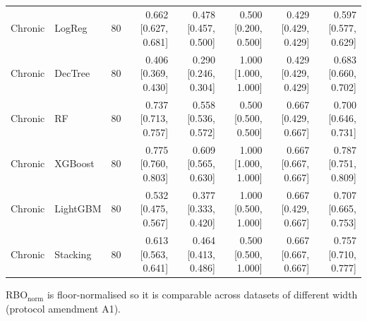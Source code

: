 \begin{table}[t]
{\begin{tabular}{llrrrrrr}
Chronic & LogReg & 80 & 0.662 [0.627, 0.681] & 0.478 [0.457, 0.500] & 0.500 [0.200, 0.500] & 0.429 [0.429, 0.429] & 0.597 [0.577, 0.629] \\
Chronic & DecTree & 80 & 0.406 [0.369, 0.430] & 0.290 [0.246, 0.304] & 1.000 [1.000, 1.000] & 0.429 [0.429, 0.429] & 0.683 [0.660, 0.702] \\
Chronic & RF & 80 & 0.737 [0.713, 0.757] & 0.558 [0.536, 0.572] & 0.500 [0.500, 0.500] & 0.667 [0.429, 0.667] & 0.700 [0.646, 0.731] \\
Chronic & XGBoost & 80 & 0.775 [0.760, 0.803] & 0.609 [0.565, 0.630] & 1.000 [1.000, 1.000] & 0.667 [0.667, 0.667] & 0.787 [0.751, 0.809] \\
Chronic & LightGBM & 80 & 0.532 [0.475, 0.567] & 0.377 [0.333, 0.420] & 1.000 [0.500, 1.000] & 0.667 [0.429, 0.667] & 0.707 [0.665, 0.753] \\
Chronic & Stacking & 80 & 0.613 [0.563, 0.641] & 0.464 [0.413, 0.486] & 0.500 [0.500, 1.000] & 0.667 [0.667, 0.667] & 0.757 [0.710, 0.777] \\
\bottomrule
\end{tabular}
}
\par\vspace{2pt}\footnotesize RBO$_{\text{norm}}$ is floor-normalised so it is comparable across datasets of different width (protocol amendment A1).
\end{table}
